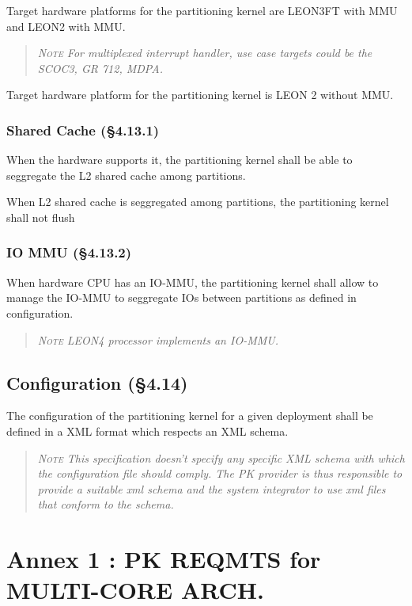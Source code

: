 Target hardware platforms for the partitioning kernel are LEON3FT with MMU and LEON2 with MMU.
\begin{quote}\it
\textsc{Note}
For multiplexed interrupt handler, use case targets could  be the SCOC3, GR 712, MDPA.
\end{quote}

Target hardware platform for the partitioning kernel is LEON 2 without MMU.

\subsubsection{Shared Cache (\S4.13.1)}

When the hardware supports it, the partitioning kernel shall be able to seggregate the L2 shared cache among partitions.

When L2 shared cache is seggregated among partitions, the partitioning kernel shall not flush

\subsubsection{IO MMU (\S4.13.2)}

When hardware CPU has an IO-MMU, the partitioning kernel shall allow to manage the IO-MMU to seggregate IOs between partitions as defined in configuration.
\begin{quote}\it
\textsc{Note}
LEON4 processor implements an IO-MMU.
\end{quote}

\subsection{Configuration (\S4.14)}

The configuration of the partitioning kernel for a given deployment shall be defined in a XML format which respects an XML schema.
\begin{quote}\it
\textsc{Note}
This specification doesn't specify any specific XML schema with which the configuration file should comply. The PK provider is thus responsible to provide a suitable xml schema and the system integrator to use xml files that conform to the schema.
\end{quote}

\newpage
\section{Annex 1 : PK REQMTS for MULTI-CORE ARCH.}

